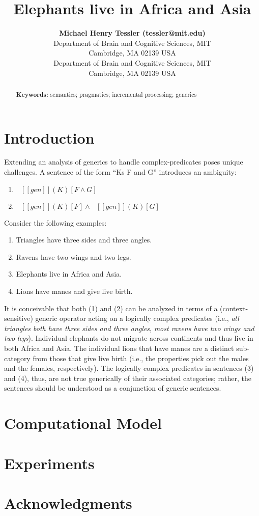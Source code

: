 \documentclass[10pt,letterpaper]{article}
\title{Elephants live in Africa and Asia}
\author{{\large \bf Michael Henry Tessler (tessler@mit.edu)} \\
  Department of Brain and Cognitive Sciences, MIT \\
  Cambridge, MA 02139 USA
  \AND {\large \bf Roger Levy (SDJ@Macc.Wisc.Edu)} \\
  Department of Brain and Cognitive Sciences, MIT \\
  Cambridge, MA 02139 USA}
\providecommand{\tightlist}{%
  \setlength{\itemsep}{0pt}\setlength{\parskip}{0pt}}
\newcommand{\denote}[1]{\mbox{ $[\![ #1 ]\!]$}}
\begin{document}
\maketitle


\begin{abstract}

\textbf{Keywords:} 
semantics; pragmatics; incremental processing; generics
\end{abstract}


\section{Introduction}

Extending an analysis of generics to handle complex-predicates poses unique challenges.
A sentence of the form ``Ks F and G'' introduces an ambiguity:

\begin{enumerate}
\item $\denote{gen}(K) [F \land G]$
\item $\denote{gen}(K) [F] \land \denote{gen}(K) [G]$
\end{enumerate}

Consider the following examples:

\begin{enumerate}
\tightlist
\item Triangles have three sides and three angles.
\item Ravens have two wings and two legs.
\item Elephants live in Africa and Asia.
\item Lions have manes and give live birth.
\end{enumerate}

It is conceivable that both (1) and (2) can be analyzed in terms of a (context-sensitive) generic operator acting on a logically complex predicates (i.e., \emph{all triangles both have three sides and three angles}, \emph{most ravens have two wings and two legs}). 
Individual elephants do not migrate across continents and thus live in both Africa and Asia. 
The individual lions that have manes are a distinct sub-category from those that give live birth (i.e., the properties pick out the males and the females, respectively). 
The logically complex predicates in sentences (3) and (4), thus, are not true generically of their associated categories; rather, the sentences should be understood as a conjunction of generic sentences.

\section{Computational Model}


\section{Experiments}


\section{Acknowledgments}





\setlength{\bibleftmargin}{.125in}
\setlength{\bibindent}{-\bibleftmargin}


\end{document}
